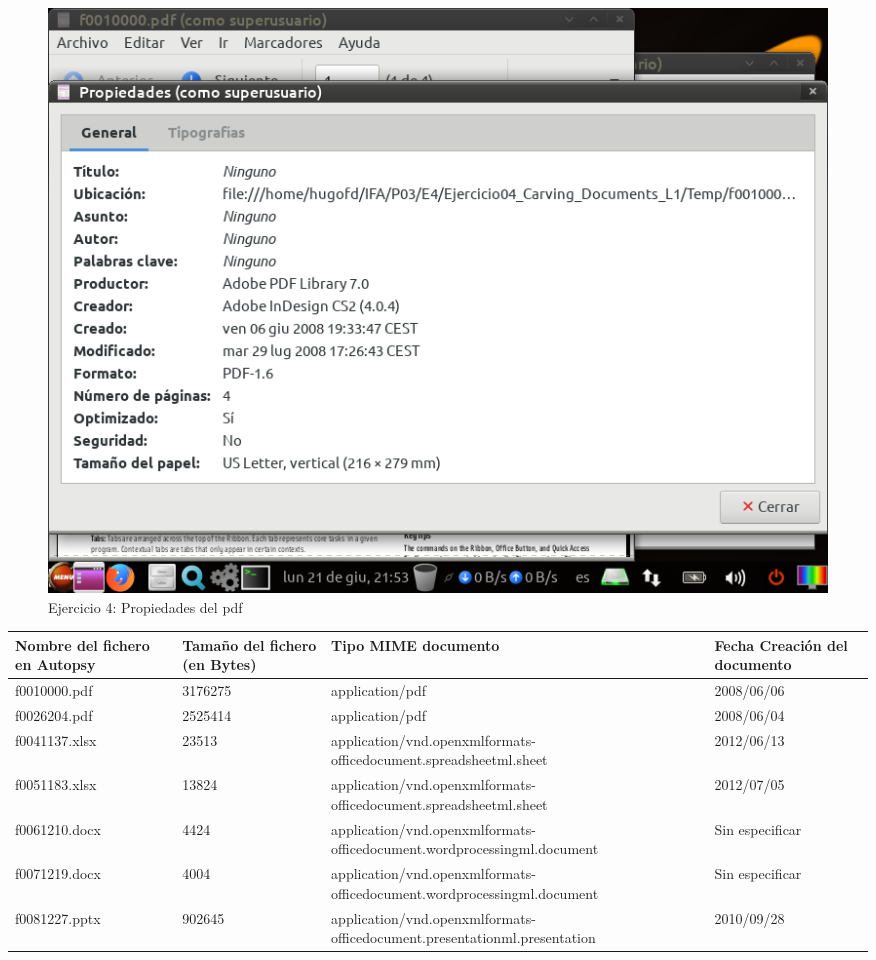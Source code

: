 \documentclass[11pt]{article}
\begin{document}
\begin{figure}[H]
    \caption{Ejercicio 4: Propiedades del pdf}
    \centering
    \includegraphics[scale=0.7]{e4-6.png}
\end{figure}

\begin{table}[H]
    \centering
    \begin{tabular}{|p{3cm}|p{2cm}|p{8cm}|p{2cm}|}
        \hline
        Nombre del fichero en Autopsy & Tamaño del fichero (en Bytes) & Tipo MIME documento & Fecha Creación del documento \\
        \hline\hline
        f0010000.pdf & 3176275 & application/pdf & 2008/06/06 \\
        \hline
        f0026204.pdf & 2525414 & application/pdf & 2008/06/04 \\
        \hline
        f0041137.xlsx & 23513 & application/vnd.openxmlformats-officedocument.spreadsheetml.sheet & 2012/06/13 \\
        \hline
        f0051183.xlsx & 13824 & application/vnd.openxmlformats-officedocument.spreadsheetml.sheet & 2012/07/05 \\
        \hline
        f0061210.docx & 4424 & application/vnd.openxmlformats-officedocument.wordprocessingml.document & Sin especificar \\
        \hline
        f0071219.docx & 4004 & application/vnd.openxmlformats-officedocument.wordprocessingml.document & Sin especificar \\
        \hline
        f0081227.pptx & 902645 & application/vnd.openxmlformats-officedocument.presentationml.presentation & 2010/09/28 \\
        \hline
    \end{tabular}
\end{table}
\end{document}
